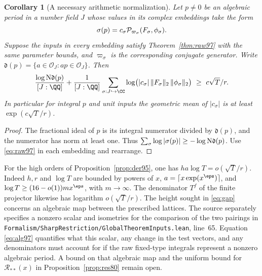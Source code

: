 \documentclass[a4paper,11pt]{article}
\newtheorem{corollary}[proposition]{Corollary}
\theoremstyle{definition}
\theoremstyle{remark}
\newcommand{\srcloc}[2]{{\small\nolinkurl{#1.lean}}, line~#2}
\numberwithin{equation}{section}
\begin{document}
\begin{corollary}[A necessary arithmetic normalization]\label{cor:alg97}
Let \(p\ne0\) be an algebraic period in a number field \(J\)
whose values in its complex embeddings take the form
\[
    \sigma(p)=c_\sigma
         {\cal P}_{\varpi_\sigma}(F_\sigma,\phi_\sigma).
\]
Suppose the inputs in every embedding satisfy Theorem~\ref{thm:raw97}
with the same parameter bounds, and \(\varpi_\sigma\) is the
corresponding conjugate generator. Write
\(\mathfrak d(p)=\{a\in\mathcal O_J:ap\in\mathcal O_J\}\).
Then
\begin{equation}
 \frac{\log {\rm N}\mathfrak d(p)}{[J:\QQ]}+
 \frac1{[J:\QQ]}\sum_{\sigma:J\hookrightarrow\CC}
        \log\!\big(|c_\sigma|\,\|F_\sigma\|_2\,\|\phi_\sigma\|_2\big)
       \ \ge\ c\sqrt T/r .                                    \label{eq:alg97}
\end{equation}
In particular for integral \(p\) and unit inputs the geometric
mean of \(|c_\sigma|\) is at least \(\exp(c\sqrt T/r)\).
\end{corollary}
\begin{proof}
The fractional ideal of \(p\) is its integral numerator divided
by \(\mathfrak d(p)\), and the numerator has norm at least one.
Thus \(\sum_\sigma\log|\sigma(p)|\ge-\log {\rm N}\mathfrak d(p)\).
Use \eqref{eq:raw97} in each embedding and rearrange.
\end{proof}

For the high orders of Proposition~\ref{prop:der95}, one has
\(ha\log T=o(\sqrt T/r)\). Indeed \(h,r\) and \(\log T\) are
bounded by powers of \(x\), \(a=\lceil x\exp(x^\eps)\rceil\),
and \(\log T\ge(16-o(1))m x^\eps\), with \(m\to\infty\).
The denominator \(T^f\) of the finite projector likewise has
logarithm \(o(\sqrt T/r)\). The height sought in \eqref{eq:gap}
concerns an algebraic map between the prescribed lattices. The
source separately specifies a nonzero scalar and isometries for the
comparison of the two pairings in
\srcloc{Formalism/SharpRestriction/GlobalTheoremInputs}{65}.
Equation \eqref{eq:alg97} quantifies what this scalar, any change
in the test vectors, and any denominators must account for if the
raw fixed-type integrals represent a nonzero algebraic period.
A bound on that algebraic map and the uniform bound for
\(\mathcal R_{**}(x)\) in Proposition~\ref{prop:res80} remain open.
\end{document}
